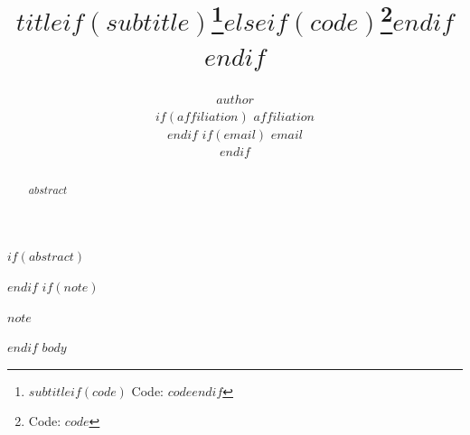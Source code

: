 \documentclass{article}
\title{$title$$if(subtitle)$\thanks{$subtitle$$if(code)$ Code: $code$$endif$}$else$$if(code)$\thanks{Code: $code$}$endif$$endif$}
\author{%
  $author$ \\
$if(affiliation)$
  $affiliation$ \\
$endif$
$if(email)$
  \href{mailto:$email$}{\texttt{$email$}} \\
$endif$
}
\begin{document}
\maketitle
$if(abstract)$
\begin{abstract}
$abstract$
\end{abstract}
$endif$
$if(note)$
{\small
$note$
\par}
$endif$
$body$
\end{document}
